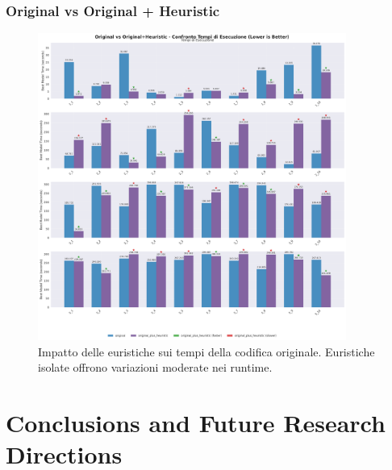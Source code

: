 \documentclass[11pt,a4paper]{article}
\begin{document}
\subsubsection{Original vs Original + Heuristic}
\begin{figure}[H]
  \centering
  \includegraphics[width=0.9\textwidth]{../Results/graphs/time_comparison_original_vs_original_heuristic.png}
  \caption{Impatto delle euristiche sui tempi della codifica originale. 
  Euristiche isolate offrono variazioni moderate nei runtime.}
\end{figure}

\section{Conclusions and Future Research Directions}
\end{document}
